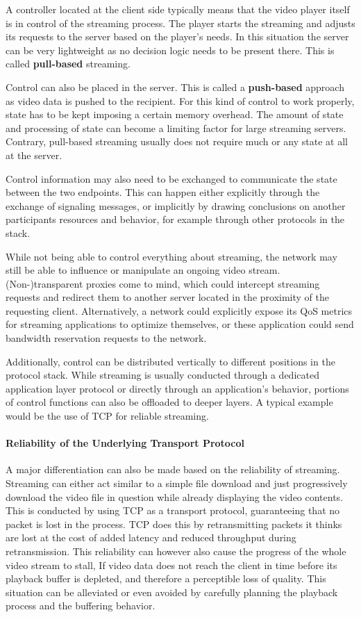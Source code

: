 A controller located at the client side typically means that the video player itself is in control of the streaming process. The player starts the streaming and adjusts its requests to the server based on the player's needs. In this situation the server can be very lightweight as no decision logic needs to be present there. This is called \textbf{pull-based} streaming.

Control can also be placed in the server. This is called a \textbf{push-based} approach as video data is pushed to the recipient. For this kind of control to work properly, state has to be kept imposing a certain memory overhead. The amount of state and processing of state can become a limiting factor for large streaming servers. Contrary, pull-based streaming usually does not require much or any state at all at the server.

Control information may also need to be exchanged to communicate the state between the two endpoints. This can happen either explicitly through the exchange of signaling messages, or implicitly by drawing conclusions on another participants resources and behavior, for example through other protocols in the stack.

While not being able to control everything about streaming, the network may still be able to influence or manipulate an ongoing video stream. (Non-)transparent proxies come to mind, which could intercept streaming requests and redirect them to another server located in the proximity of the requesting client. Alternatively, a network could explicitly expose its \gls{QoS} metrics for streaming applications to optimize themselves, or these application could send bandwidth reservation requests to the network.

Additionally, control can be distributed vertically to different positions in the protocol stack. While streaming is usually conducted through a dedicated application layer protocol or directly through an application's behavior, portions of control functions can also be offloaded to deeper layers. A typical example would be the use of \gls{TCP} for reliable streaming.


\paragraph{Reliability of the Underlying Transport Protocol}
A major differentiation can also be made based on the reliability of streaming. Streaming can either act similar to a simple file download and just progressively download the video file in question while already displaying the video contents. This is conducted by using \gls{TCP} as a transport protocol, guaranteeing that no packet is lost in the process. \gls{TCP} does this by retransmitting packets it thinks are lost at the cost of added latency and reduced throughput during retransmission. This reliability can however also cause the progress of the whole video stream to stall, If video data does not reach the client in time before its playback buffer is depleted, and therefore a perceptible loss of quality. This situation can be alleviated or even avoided by carefully planning the playback process and the buffering behavior.

